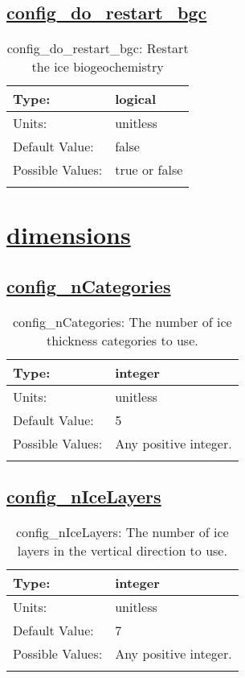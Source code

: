 \subsection[config\_do\_restart\_bgc]{\hyperref[sec:nm_tab_restart]{config\_do\_restart\_bgc}}
\label{subsec:nm_sec_config_do_restart_bgc}
\begin{center}
\begin{longtable}{| p{2.0in} || p{4.0in} |}
    \hline
    Type: & logical \\
    \hline
    Units: & \si{unitless} \\
    \hline
    Default Value: & false \\
    \hline
    Possible Values: & true or false \\
    \hline
    \caption{config\_do\_restart\_bgc: Restart the ice biogeochemistry}
\end{longtable}
\end{center}
\section[dimensions]{\hyperref[sec:nm_tab_dimensions]{dimensions}}
\label{sec:nm_sec_dimensions}
\subsection[config\_nCategories]{\hyperref[sec:nm_tab_dimensions]{config\_nCategories}}
\label{subsec:nm_sec_config_nCategories}
\begin{center}
\begin{longtable}{| p{2.0in} || p{4.0in} |}
    \hline
    Type: & integer \\
    \hline
    Units: & \si{unitless} \\
    \hline
    Default Value: & 5 \\
    \hline
    Possible Values: & Any positive integer. \\
    \hline
    \caption{config\_nCategories: The number of ice thickness categories to use.}
\end{longtable}
\end{center}
\subsection[config\_nIceLayers]{\hyperref[sec:nm_tab_dimensions]{config\_nIceLayers}}
\label{subsec:nm_sec_config_nIceLayers}
\begin{center}
\begin{longtable}{| p{2.0in} || p{4.0in} |}
    \hline
    Type: & integer \\
    \hline
    Units: & \si{unitless} \\
    \hline
    Default Value: & 7 \\
    \hline
    Possible Values: & Any positive integer. \\
    \hline
    \caption{config\_nIceLayers: The number of ice layers in the vertical direction to use.}
\end{longtable}
\end{center}
